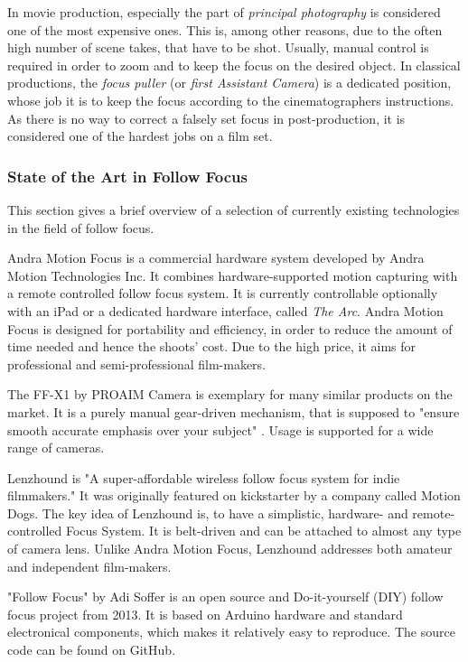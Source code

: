 \documentclass{sigchi}
\begin{document}
In movie production, especially the part of \textit{principal photography} is considered one of the most expensive ones. This is, among other reasons, due to the often high number of scene takes, that have to be shot. \cite{kcrabb}
Usually, manual control is required in order to zoom and to keep the focus on the desired object. In classical productions, the \textit{focus puller} (or \textit{first Assistant Camera}) is a dedicated position, whose job it is to keep the focus according to the cinematographers instructions. As there is no way to correct a falsely set focus in post-production, it is considered one of the hardest jobs on a film set. \cite{cineman}

\subsubsection{State of the Art in Follow Focus}

This section gives a brief overview of a selection of currently existing technologies in the field of follow focus. 

Andra Motion Focus is a commercial hardware system developed by Andra Motion Technologies Inc. It combines hardware-supported motion capturing with a remote controlled follow focus system. It is currently controllable optionally with an iPad or a dedicated hardware interface, called \textit{The Arc}. Andra Motion Focus is designed for portability and efficiency, in order to reduce the amount of time needed and hence the shoots' cost. Due to the high price, it aims for professional and semi-professional film-makers. \cite{andra}

The FF-X1 by PROAIM Camera is exemplary for many similar products on the market. It is a purely manual gear-driven mechanism, that is supposed to "ensure smooth accurate emphasis over your subject" \cite{proaim}. Usage is supported for a wide range of cameras. 

Lenzhound is "A super-affordable wireless follow focus system for indie filmmakers." \cite{kicklenz} It was originally featured on kickstarter by a company called Motion Dogs. The key idea of Lenzhound is, to have a simplistic, hardware- and remote-controlled Focus System. It is belt-driven and can be attached to almost any type of camera lens. Unlike Andra Motion Focus, Lenzhound addresses both amateur and independent film-makers. 

"Follow Focus" by Adi Soffer is an open source and Do-it-yourself (DIY) follow focus project from 2013. It is based on Arduino hardware and standard electronical components, which makes it relatively easy to reproduce. The source code can be found on GitHub. \cite{soffer}
\end{document}
